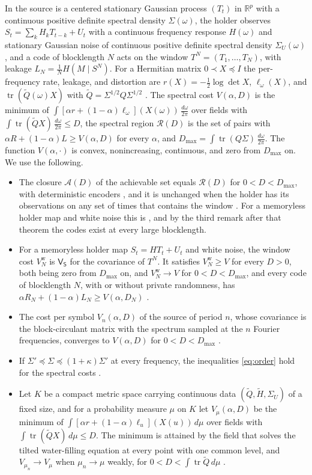 \documentclass[11pt,onecolumn]{IEEEtran}
\newcommand{\R}{\mathbb{R}}
\newcommand{\tr}{\operatorname{tr}}
\newcommand{\dw}{\tfrac{d\omega}{2\pi}}
\begin{document}
In \cite{part2} the source is a centered stationary Gaussian process
$(T_t)$ in $\R^p$ with a continuous positive definite spectral density
$\Sigma(\omega)$, the holder observes $S_t=\sum_kH_kT_{t-k}+U_t$ with a
continuous frequency response $H(\omega)$ and stationary Gaussian noise
of continuous positive definite spectral density $\Sigma_U(\omega)$, and
a code of blocklength $N$ acts on the window $T^N=(T_1,\dots,T_N)$,
with leakage $L_N=\tfrac1NH(M\mid S^N)$. For a Hermitian matrix
$0\prec X\preceq I$ the per-frequency rate, leakage, and distortion are
$r(X)=-\tfrac12\log\det X$, $\ell_\omega(X)$, and
$\tr(\tilde Q(\omega)X)$ with
$\tilde Q=\Sigma^{1/2}Q\Sigma^{1/2}$ \cite[Sec.~II]{part2}. The spectral
cost $V(\alpha,D)$ is the minimum of
$\int[\alpha r+(1-\alpha)\ell_\omega](X(\omega))\,\dw$ over fields with
$\int\tr(\tilde QX)\,\dw\le D$, the spectral region $\mathcal R(D)$ is
the set of pairs with $\alpha R+(1-\alpha)L\ge V(\alpha,D)$ for every
$\alpha$, and $D_{\max}=\int\tr(Q\Sigma)\,\dw$. The function
$V(\alpha,\cdot)$ is convex, nonincreasing, continuous, and zero from
$D_{\max}$ on. We use the following.
\begin{itemize}
\item[(i)] The closure $\mathcal A(D)$ of the achievable set equals
$\mathcal R(D)$ for $0<D<D_{\max}$, with deterministic encoders
\cite[Theorem~22]{part2}, and it is unchanged when the holder has its
observations on any set of times that contains the window
\cite[Theorem~23]{part2}. For a memoryless holder map and white noise
this is \cite[Theorem~16]{part2}, and by the third remark after that
theorem the codes exist at every large blocklength.
\item[(ii)] For a memoryless holder map $S_t=HT_t+U_t$ and white noise,
the window cost $V^{\mathrm w}_N$ is $\mathsf V_{\mathsf S}$ for the
covariance of $T^N$. It satisfies $V^{\mathrm w}_N\ge V$ for every
$D>0$, both being zero from $D_{\max}$ on, and
$V^{\mathrm w}_N\to V$ for $0<D<D_{\max}$, and every code of blocklength
$N$, with or without private randomness, has
$\alpha R_N+(1-\alpha)L_N\ge V(\alpha,D_N)$
\cite[Theorem~15]{part2}.
\item[(iii)] The cost per symbol $V_n(\alpha,D)$ of the source of period
$n$, whose covariance is the block-circulant matrix with the spectrum
sampled at the $n$ Fourier frequencies, converges to $V(\alpha,D)$ for
$0<D<D_{\max}$ \cite[Theorem~4]{part2}.
\item[(iv)] If $\Sigma'\preceq\Sigma\preceq(1+\kappa)\Sigma'$ at every
frequency, the inequalities \eqref{eq:order} hold for the spectral
costs \cite[Lemma~11(c)]{part2}.
\item[(v)] Let $K$ be a compact metric space carrying continuous data
$(\tilde Q,\tilde H,\Sigma_U)$ of a fixed size, and for a probability
measure $\mu$ on $K$ let $V_\mu(\alpha,D)$ be the minimum of
$\int[\alpha r+(1-\alpha)\ell_u](X(u))\,d\mu$ over fields with
$\int\tr(\tilde QX)\,d\mu\le D$. The minimum is attained by the field
that solves the tilted water-filling equation at every point with one
common level, and $V_{\mu_n}\to V_\mu$ when $\mu_n\to\mu$ weakly, for
$0<D<\int\tr\tilde Q\,d\mu$ \cite[Lemma~2]{part2}.
\end{itemize}
\end{document}
